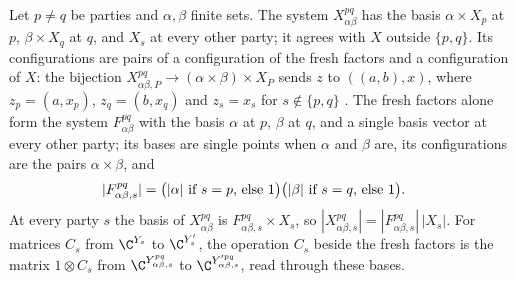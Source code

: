 \begin{definition}
    \label{def:party_add_pair}
    \leanok
    Let $p\neq q$ be parties and $\alpha,\beta$ finite sets. The system
    $X^{pq}_{\alpha\beta}$ has the basis $\alpha\times X_p$ at $p$,
    $\beta\times X_q$ at $q$, and $X_s$ at every other party; it agrees with $X$
    outside $\{p,q\}$. Its configurations are pairs of a configuration of the fresh
    factors and a configuration of $X$: the bijection
    $X^{pq}_{\alpha\beta,P}\to(\alpha\times\beta)\times X_P$ sends $z$ to $((a,b),x)$,
    where $z_p=(a,x_p)$, $z_q=(b,x_q)$ and $z_s=x_s$ for $s\notin\{p,q\}$
    \cite[Section~5.1]{OpenAI2026PolynomialPEPS}. The fresh factors alone form the
    system $F^{pq}_{\alpha\beta}$ with the basis $\alpha$ at $p$, $\beta$ at $q$, and a
    single basis vector at every other party; its bases are single points when $\alpha$
    and $\beta$ are, its configurations are the pairs $\alpha\times\beta$, and
    \begin{align}
        |F^{pq}_{\alpha\beta,s}|
         & =\bigl(|\alpha|\text{ if }s=p\text{, else }1\bigr)
        \bigl(|\beta|\text{ if }s=q\text{, else }1\bigr). \notag
    \end{align}
    At every party $s$ the basis of $X^{pq}_{\alpha\beta}$ is
    $F^{pq}_{\alpha\beta,s}\times X_s$, so
    $|X^{pq}_{\alpha\beta,s}|=|F^{pq}_{\alpha\beta,s}|\,|X_s|$. For matrices $C_s$
    from $\C^{Y_s}$ to $\C^{Y'_s}$, the operation $C_s$ beside the fresh factors is the
    matrix $1\otimes C_s$ from $\C^{Y^{pq}_{\alpha\beta,s}}$ to
    $\C^{Y'^{pq}_{\alpha\beta,s}}$, read through these bases.
\end{definition}

